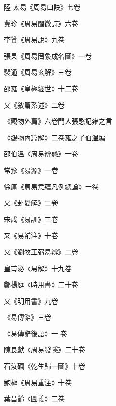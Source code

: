 \begin{pinyinscope}
 陸
 太易《周易口訣》七卷



 冀珍《周易闡微詩》六卷



 李贊《周易說》九卷



 張杲《周易罔象成名圖》一卷



 裴通《周易玄解》三卷



 邵雍《皇極經世》十二卷



 又《敘篇系述》二卷



 《觀物外篇》六卷門人張愍記雍之言



 《觀物內篇解》二卷雍之子伯溫編



 邵伯溫《周易辨惑》一卷



 常豫《易源》一卷



 徐庸《周易意蘊凡例總論》一卷



 又《卦變解》二卷



 宋咸《易訓》三卷



 又《易補注》十卷



 又《劉牧王弼易辨》二卷



 皇甫泌《易解》十九卷



 鄭揚庭《時用書》二十卷



 又《明用書》九卷



 《易傳辭》三卷



 《易傳辭後語》一
 卷



 陳良獻《周易發隱》二十卷



 石汝礪《乾生歸一圖》十卷



 鮑極《周易重注》十卷



 葉昌齡《圖義》二卷




\end{pinyinscope}
